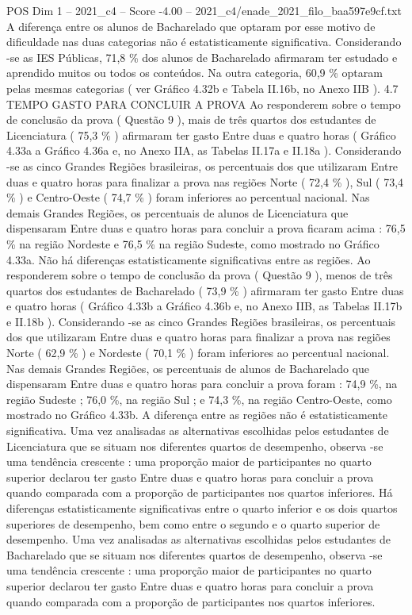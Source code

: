 \begin{textsample}{POS Dim 1 – 2021\_c4 – Score -4.00 – 2021\_c4/enade\_2021\_filo\_baa597e9cf.txt}
A diferença entre os alunos de Bacharelado que optaram por esse motivo de dificuldade nas duas categorias não é estatisticamente significativa.
Considerando -se as IES Públicas, 71,8 \% dos alunos de Bacharelado afirmaram ter estudado e aprendido muitos ou todos os conteúdos.
Na outra categoria, 60,9 \% optaram pelas mesmas categorias ( ver Gráfico 4.32b e Tabela II.16b, no Anexo IIB ). 4.7 TEMPO GASTO PARA CONCLUIR A PROVA Ao responderem sobre o tempo de conclusão da prova ( Questão 9 ), mais de três quartos dos estudantes de Licenciatura ( 75,3 \% ) afirmaram ter gasto Entre duas e quatro horas ( Gráfico 4.33a a Gráfico 4.36a e, no Anexo IIA, as Tabelas II.17a e II.18a ).
Considerando -se as cinco Grandes Regiões brasileiras, os percentuais dos que utilizaram Entre duas e quatro horas para finalizar a prova nas regiões Norte ( 72,4 \% ), Sul ( 73,4 \% ) e Centro-Oeste ( 74,7 \% ) foram inferiores ao percentual nacional.
Nas demais Grandes Regiões, os percentuais de alunos de Licenciatura que dispensaram Entre duas e quatro horas para concluir a prova ficaram acima : 76,5 \% na região Nordeste e 76,5 \% na região Sudeste, como mostrado no Gráfico 4.33a.
Não há diferenças estatisticamente significativas entre as regiões.
Ao responderem sobre o tempo de conclusão da prova ( Questão 9 ), menos de três quartos dos estudantes de Bacharelado ( 73,9 \% ) afirmaram ter gasto Entre duas e quatro horas ( Gráfico 4.33b a Gráfico 4.36b e, no Anexo IIB, as Tabelas II.17b e II.18b ).
Considerando -se as cinco Grandes Regiões brasileiras, os percentuais dos que utilizaram Entre duas e quatro horas para finalizar a prova nas regiões Norte ( 62,9 \% ) e Nordeste ( 70,1 \% ) foram inferiores ao percentual nacional.
Nas demais Grandes Regiões, os percentuais de alunos de Bacharelado que dispensaram Entre duas e quatro horas para concluir a prova foram : 74,9 \%, na região Sudeste ; 76,0 \%, na região Sul ; e 74,3 \%, na região Centro-Oeste, como mostrado no Gráfico 4.33b.
A diferença entre as regiões não é estatisticamente significativa.
Uma vez analisadas as alternativas escolhidas pelos estudantes de Licenciatura que se situam nos diferentes quartos de desempenho, observa -se uma tendência crescente : uma proporção maior de participantes no quarto superior declarou ter gasto Entre duas e quatro horas para concluir a prova quando comparada com a proporção de participantes nos quartos inferiores.
Há diferenças estatisticamente significativas entre o quarto inferior e os dois quartos superiores de desempenho, bem como entre o segundo e o quarto superior de desempenho.
Uma vez analisadas as alternativas escolhidas pelos estudantes de Bacharelado que se situam nos diferentes quartos de desempenho, observa -se uma tendência crescente : uma proporção maior de participantes no quarto superior declarou ter gasto Entre duas e quatro horas para concluir a prova quando comparada com a proporção de participantes nos quartos inferiores.

\end{textsample}
